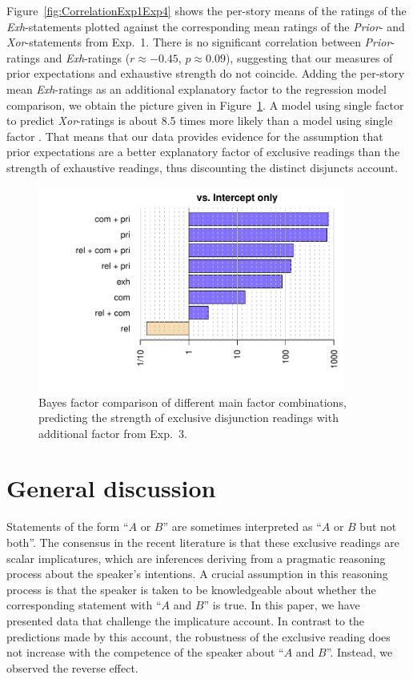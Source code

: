 \documentclass[12pt]{article}
\begin{document}
Figure~\ref{fig:CorrelationExp1Exp4} shows the per-story means of the ratings of the
\emph{Exh}-statements plotted against the corresponding mean ratings of the \emph{Prior}- and
\emph{Xor}-statements from Exp.~1. There is no significant correlation between
\emph{Prior}-ratings and \emph{Exh}-ratings ($r \approx -0.45$, $p \approx 0.09$), suggesting
that our measures of prior expectations and exhaustive strength do not coincide. Adding the
per-story mean \emph{Exh}-ratings as an additional explanatory factor \exh to the regression
model comparison, we obtain the picture given in Figure~\ref{fig:BayesFactorsExp4}. A model
using single factor \pri to predict \emph{Xor}-ratings is about 8.5 times more likely than a
model using single factor \exh. That means that our data provides evidence for the assumption
that prior expectations are a better explanatory factor of exclusive readings than the strength
of exhaustive readings, thus discounting the distinct disjuncts account.

\begin{figure}
  \centering
  \includegraphics[width=0.9\textwidth]{pics/bfsAllExp4.pdf}
  \caption{Bayes factor comparison of different main factor combinations, predicting the
    strength of exclusive disjunction readings with additional factor \exh from Exp.~3.}
\label{fig:BayesFactorsExp4}
\end{figure}

\section{General discussion}

Statements of the form ``$A$ or $B$'' are sometimes interpreted as ``$A$ or $B$ but not both''. The
consensus in the recent literature is that these exclusive readings are scalar implicatures,
which are inferences deriving from a pragmatic reasoning process about the speaker's
intentions. A crucial assumption in this reasoning process is that the speaker is taken to be
knowledgeable about whether the corresponding statement with ``$A$ and $B$'' is true. In this
paper, we have presented data that challenge the implicature account. In contrast to the
predictions made by this account, the robustness of the exclusive reading does not increase
with the competence of the speaker about ``$A$ and $B$''. Instead, we observed the reverse
effect.
\end{document}
